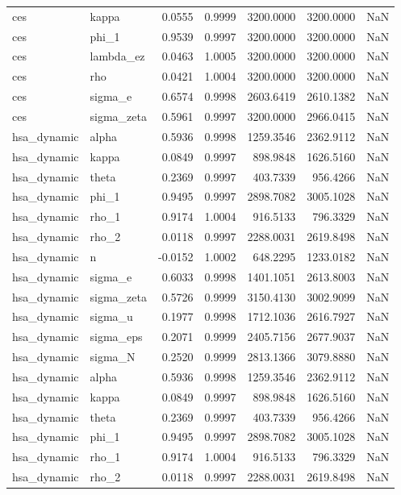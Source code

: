 \begin{tabular}{llrrrrl}
ces & kappa & 0.0555 & 0.9999 & 3200.0000 & 3200.0000 & NaN \\
ces & phi\_1 & 0.9539 & 0.9997 & 3200.0000 & 3200.0000 & NaN \\
ces & lambda\_ez & 0.0463 & 1.0005 & 3200.0000 & 3200.0000 & NaN \\
ces & rho & 0.0421 & 1.0004 & 3200.0000 & 3200.0000 & NaN \\
ces & sigma\_e & 0.6574 & 0.9998 & 2603.6419 & 2610.1382 & NaN \\
ces & sigma\_zeta & 0.5961 & 0.9997 & 3200.0000 & 2966.0415 & NaN \\
hsa\_dynamic & alpha & 0.5936 & 0.9998 & 1259.3546 & 2362.9112 & NaN \\
hsa\_dynamic & kappa & 0.0849 & 0.9997 & 898.9848 & 1626.5160 & NaN \\
hsa\_dynamic & theta & 0.2369 & 0.9997 & 403.7339 & 956.4266 & NaN \\
hsa\_dynamic & phi\_1 & 0.9495 & 0.9997 & 2898.7082 & 3005.1028 & NaN \\
hsa\_dynamic & rho\_1 & 0.9174 & 1.0004 & 916.5133 & 796.3329 & NaN \\
hsa\_dynamic & rho\_2 & 0.0118 & 0.9997 & 2288.0031 & 2619.8498 & NaN \\
hsa\_dynamic & n & -0.0152 & 1.0002 & 648.2295 & 1233.0182 & NaN \\
hsa\_dynamic & sigma\_e & 0.6033 & 0.9998 & 1401.1051 & 2613.8003 & NaN \\
hsa\_dynamic & sigma\_zeta & 0.5726 & 0.9999 & 3150.4130 & 3002.9099 & NaN \\
hsa\_dynamic & sigma\_u & 0.1977 & 0.9998 & 1712.1036 & 2616.7927 & NaN \\
hsa\_dynamic & sigma\_eps & 0.2071 & 0.9999 & 2405.7156 & 2677.9037 & NaN \\
hsa\_dynamic & sigma\_N & 0.2520 & 0.9999 & 2813.1366 & 3079.8880 & NaN \\
hsa\_dynamic & alpha & 0.5936 & 0.9998 & 1259.3546 & 2362.9112 & NaN \\
hsa\_dynamic & kappa & 0.0849 & 0.9997 & 898.9848 & 1626.5160 & NaN \\
hsa\_dynamic & theta & 0.2369 & 0.9997 & 403.7339 & 956.4266 & NaN \\
hsa\_dynamic & phi\_1 & 0.9495 & 0.9997 & 2898.7082 & 3005.1028 & NaN \\
hsa\_dynamic & rho\_1 & 0.9174 & 1.0004 & 916.5133 & 796.3329 & NaN \\
hsa\_dynamic & rho\_2 & 0.0118 & 0.9997 & 2288.0031 & 2619.8498 & NaN \\

\end{tabular}
